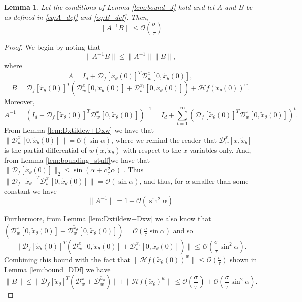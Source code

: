 \documentclass[12pt]{article}
\newtheorem{Lemma}[Theorem]{Lemma}
\theoremstyle{remark}
\newcommand{\DD}{\mathcal{D}}
\newcommand{\OO}{\mathcal{O}}
\newcommand{\HH}{\mathcal{H}}
\newcommand{\wtilde}[1]{\widetilde{#1}}
\begin{document}
\begin{appendices}
\begin{Lemma}\label{lem:bound_A_inv_B}
Let the conditions of Lemma \ref{lem:bound_J} hold and let $A$ and $B$ be as defined in \eqref{eq:A_def} and \eqref{eq:B_def}.
Then,
    \[
    \|A^{-1}B\| \leq \OO(\frac{\sigma}{\tau})
    \]
\end{Lemma}
\begin{proof}
We begin by noting that 
\[
\|A^{-1}B\| \leq \|A^{-1}\|\|B\|
,\]
where
\begin{equation*}
A = I_d +  \DD_f[\wtilde{x}_\theta(0)]^T \DD^x_w[0,\wtilde{x}_\theta(0)]    
,\end{equation*}
\begin{equation*}
B = \DD_f[\wtilde{x}_\theta(0)]^T (\DD^x_w[0,\wtilde{x}_\theta(0)] + \DD^{\wtilde{x}_\theta}_w[0,\wtilde{x}_\theta(0)] )+ \HH f(\wtilde x_\theta(0))^w
.\end{equation*}
Moreover,
\[
A^{-1} = (I_d +  \DD_f[\wtilde{x}_\theta(0)]^T \DD^x_w[0, \wtilde x_\theta(0)])^{-1} = I_d + \sum_{t=1}^\infty(\DD_f[\wtilde{x}_\theta(0)]^T \DD^x_w[0, \wtilde x_\theta(0)])^t
.\]
From Lemma \ref{lem:Dxtildew+Dxw} we have that $\|\DD^x_w[0, \wtilde x_\theta(0)]\| = \OO(\sin \alpha)$, where we remind the reader that $\DD^x_w[x, \wtilde x_\theta]$ is the partial differential of $w(x, \wtilde x_\theta)$ with respect to the $x$ variables only.
And, from Lemma \ref{lem:bounding_stuff}we have that $\|\DD_f[\wtilde{x}_\theta(0)]\|_2 \leq \sin (\alpha + c\frac{\sigma}{\tau}\alpha)$ . Thus $\|\DD_f[\wtilde{x}_\theta]^T \DD^x_w[0, \wtilde x_\theta(0)]\| = \OO(\sin\alpha)$, and thus, for $\alpha$ smaller than some constant we have
\begin{equation}\label{eq:bound_A}
    \|A^{-1}\| = 1 + \OO(\sin^2\alpha)
\end{equation}

Furthermore, from Lemma \ref{lem:Dxtildew+Dxw} we also know that $(\DD^x_w[0, \wtilde x_\theta(0)] + \DD^{\wtilde{x}_\theta}_ w[0, \wtilde x_\theta(0)] ) = \OO(\frac{\sigma}{\tau} \sin\alpha)$ and so 
\[
\| \DD_f[\wtilde{x}_\theta(0)]^T (\DD^x_w[0, \wtilde x_\theta(0)] + \DD^{\wtilde{x}_\theta}_ w[0, \wtilde x_\theta(0)] )\| \leq \OO(\frac{\sigma}{\tau}\sin^2 \alpha)
.\]
Combining this bound with the fact that $\|\HH f(\wtilde x_\theta(0))^w\| \leq \OO(\frac{\sigma}{\tau}) $ shown in Lemma \ref{lem:bound_DDf} we have 
\begin{equation}\label{eq:bound_B}
\|B\| \leq  \|\DD_f[\wtilde{x}_\theta]^T (\DD^x_w + \DD^{\wtilde{x}_\theta}_ w )\|+\| \HH f(\wtilde x_\theta)^w\| \leq \OO(\frac{\sigma}{\tau}) +  \OO(\frac{\sigma}{\tau}\sin^2 \alpha)
.
\end{equation}


\end{proof}
\end{appendices}
\end{document}
